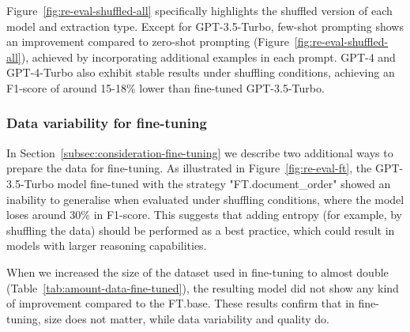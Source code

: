 Figure~\ref{fig:re-eval-shuffled-all} specifically highlights the shuffled version of each model and extraction type. Except for GPT-3.5-Turbo, few-shot prompting shows an improvement compared to zero-shot prompting (Figure~\ref{fig:re-eval-shuffled-all}), achieved by incorporating additional examples in each prompt. 
GPT-4 and GPT-4-Turbo also exhibit stable results under shuffling conditions, achieving an F1-score of around 15-18\% lower than fine-tuned GPT-3.5-Turbo.

\subsubsection{Data variability for fine-tuning}
\label{subsubsec:data-variability}

In Section~\ref{subsec:consideration-fine-tuning} we describe two additional ways to prepare the data for fine-tuning. 
As illustrated in Figure~\ref{fig:re-eval-ft}, the GPT-3.5-Turbo model fine-tuned with the strategy "FT.document\_order" showed an inability to generalise when evaluated under shuffling conditions, where the model loses around 30\% in F1-score.
This suggests that adding entropy (for example, by shuffling the data) should be performed as a best practice, which could result in models with larger reasoning capabilities.

When we increased the size of the dataset used in fine-tuning to almost double (Table~\ref{tab:amount-data-fine-tuned}), the resulting model did not show any kind of improvement compared to the FT.base. These results confirm that in fine-tuning, size does not matter, while data variability and quality do. 





